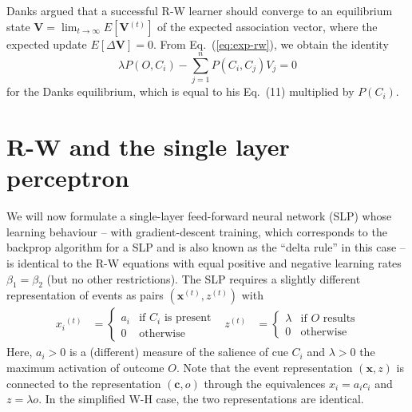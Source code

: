 \documentclass[conference]{IEEEtran}
\newcommand{\psup}[1]{\ensuremath{^{(#1)}}}
\newcommand{\psupt}{\psup{t}}
\begin{document}
Danks \cite{danks2003} argued that a successful R-W learner should converge to an equilibrium state $\mathbf{V} = \lim_{t\to\infty} E[\mathbf{V}\psupt]$ of the expected association vector, where the expected update $E[\Delta \mathbf{V}] = 0$.  From Eq.~(\ref{eq:exp-rw}), we obtain the identity
\begin{equation}
  \label{eq:danks-equi}
  \lambda P(O, C_i) - \sum_{j=1}^n P(C_i, C_j) V_j = 0
\end{equation}
for the Danks equilibrium, which is equal to his Eq.~(11) \cite[p.\ 113]{danks2003} multiplied by $P(C_i)$.

\section{R-W and the single layer perceptron}
\label{sec:slp}

We will now formulate a single-layer feed-forward neural network (SLP) whose learning behaviour -- with gradient-descent training, which corresponds to the backprop algorithm for a SLP and is also known as the ``delta rule'' in this case -- is identical to the R-W equations with equal positive and negative learning rates $\beta_1 = \beta_2$ (but no other restrictions).  The SLP requires a slightly different representation of events as pairs $(\mathbf{x}\psupt, z\psupt)$ with
\begin{align}
  \label{eq:def-x-z}
  x_i\psupt &= 
  \begin{cases}
    a_i & \text{if $C_i$ is present} \\
    0 & \text{otherwise}
  \end{cases}
  &
  z\psupt &= 
  \begin{cases}
    \lambda & \text{if $O$ results} \\
    0 & \text{otherwise}
  \end{cases}
\end{align} 
Here, $a_i > 0$ is a (different) measure of the salience of cue $C_i$ and $\lambda > 0$ the maximum activation of outcome $O$.  Note that the event representation $(\mathbf{x}, z)$ is connected to the representation $(\mathbf{c}, o)$ through the equivalences $x_i = a_i c_i$ and $z = \lambda o$.  In the simplified W-H case, the two representations are identical.
\end{document}
